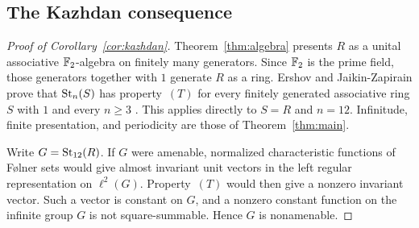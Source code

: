 \subsection{The Kazhdan consequence}\label{sec:kazhdan}

\begin{proof}[Proof of Corollary~\ref{cor:kazhdan}]
Theorem~\ref{thm:algebra} presents \(R\) as a unital associative
\(\mathbb F_2\)-algebra on finitely many generators. Since \(\mathbb F_2\) is the
prime field, those generators together with \(1\) generate \(R\) as a
ring. Ershov and Jaikin-Zapirain prove that \(\operatorname{St}_n(S)\) has
property~\((T)\) for every finitely generated associative ring \(S\)
with \(1\) and every \(n\geq3\)
\cite[Theorem~6.2]{ErshovJaikinZapirain2010}. This applies directly to
\(S=R\) and \(n=12\). Infinitude, finite presentation, and periodicity
are those of Theorem~\ref{thm:main}.

Write \(G=\operatorname{St}_{12}(R)\). If \(G\) were amenable, normalized
characteristic functions of F\o lner sets would give almost invariant
unit vectors in the left regular representation on \(\ell^2(G)\).
Property~\((T)\) would then give a nonzero invariant vector. Such a
vector is constant on \(G\), and a nonzero constant function on the
infinite group \(G\) is not square-summable. Hence \(G\) is nonamenable.
\end{proof}
